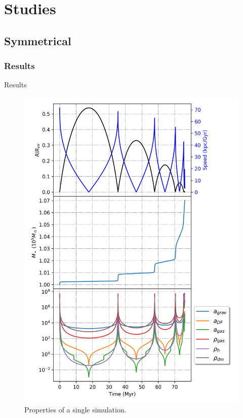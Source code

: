 \documentclass{beamer}
\begin{document}
\section{Studies}
\subsection{Symmetrical}
\subsubsection{Results}

\begin{frame}{Results}
	\begin{figure}[h]
		\centering
		\includegraphics[height=0.7\textheight]{"../Files/Week 6/properties_s01v70"}
		\caption{Properties of a single simulation.}
	\end{figure}
\end{frame}
\end{document}
